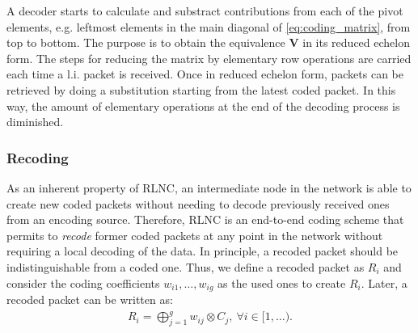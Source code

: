 A decoder starts to calculate and substract contributions from each
of the pivot elements, e.g. leftmost elements in the main diagonal of
\eqref{eq:coding_matrix}, from top to bottom. The purpose is to obtain
the equivalence  $\textbf{V}$ in its reduced echelon form. The steps
for reducing the matrix by elementary row operations are carried each time
a \ac{l.i.} packet is received. Once in reduced echelon form, packets
can be retrieved by doing a substitution starting from the latest
coded packet. In this way, the amount of elementary operations at the end
of the decoding process is diminished.

\subsubsection{Recoding}
As an inherent property of \ac{RLNC}, an intermediate node in the network
is able to create new coded packets without needing to decode previously
received ones from an encoding source. Therefore, \ac{RLNC} is an end-to-end
coding scheme that permits to \textit{recode} former coded packets at any
point in the network without requiring a local decoding of the data. In
principle, a recoded packet should be indistinguishable from a coded one.
Thus, we define a recoded packet as $R_i$ and consider the coding
coefficients $w_{i1}, \ldots, w_{ig}$ as the used ones to
create $R_i$. Later, a recoded packet can be written as:
%
\begin{align}
\label{eq:recoded_packet}
R_i = \bigoplus_{j=1}^{g} w_{ij} \otimes C_j  ,\ \forall i \in [1,\ldots).
\end{align}

